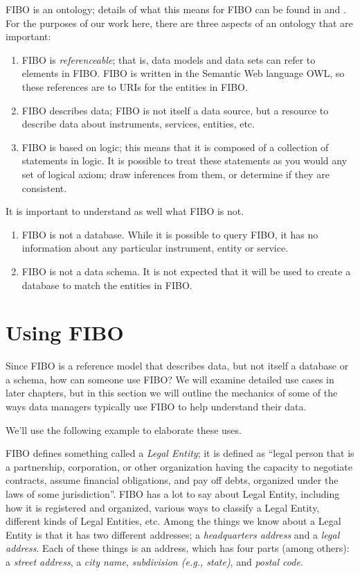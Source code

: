 FIBO is an ontology; details of what this means for FIBO can be found in \cite{KendallMcGuinness 2019} and \cite{AllemangHendler2020}.  For the purposes of our work here, there are  three aspects of an ontology that are important:
\begin{enumerate}
    \item FIBO is {\it referenceable}; that is, data models and data sets can refer to elements in FIBO.  FIBO is written in the Semantic Web language OWL, so these references are to URIs for the entities in FIBO. 
    \item FIBO describes data; FIBO is not itself a data source, but a resource to describe data about instruments, services, entities, etc. 
    \item FIBO is based on logic; this means that it is composed of a collection of statements in logic.  It is possible to treat these statements as you would any set of logical axiom; draw inferences from them, or determine if they are consistent.
\end{enumerate}

It is important to understand as well what FIBO is not.  
\begin{enumerate}
    \item FIBO is not a database.  While it is possible to query FIBO, it has no information about any particular instrument, entity or service. 
    \item FIBO is not a data schema.  It is not expected that it will be used to create a database to match the entities in FIBO. 
\end{enumerate}

\section{Using FIBO}

Since FIBO is a reference model that describes data, but not itself a database or a schema, how can someone use FIBO?  We will examine detailed use cases in later chapters, but in this section we will outline the mechanics of some of the ways data managers typically use FIBO to help understand their data.

We'll use the following example to elaborate these uses. 

FIBO defines something called a {\it Legal Entity}; it is defined as ``legal person that is a partnership, corporation, or other organization having the capacity to negotiate contracts, assume financial obligations, and pay off debts, organized under the laws of some jurisdiction''. FIBO has a lot to say about Legal Entity, including how it is registered and organized, various ways to classify a Legal Entity, different kinds of Legal Entities, etc.  Among the things we know about a Legal Entity is that it has two different addresses; a {\it headquarters address} and a {\it legal address}. Each of these things is an address, which has four parts (among others): a {\it street address},  a {\it city name}, {\it subdivision (e.g., state)}, and {\it postal code}.  

